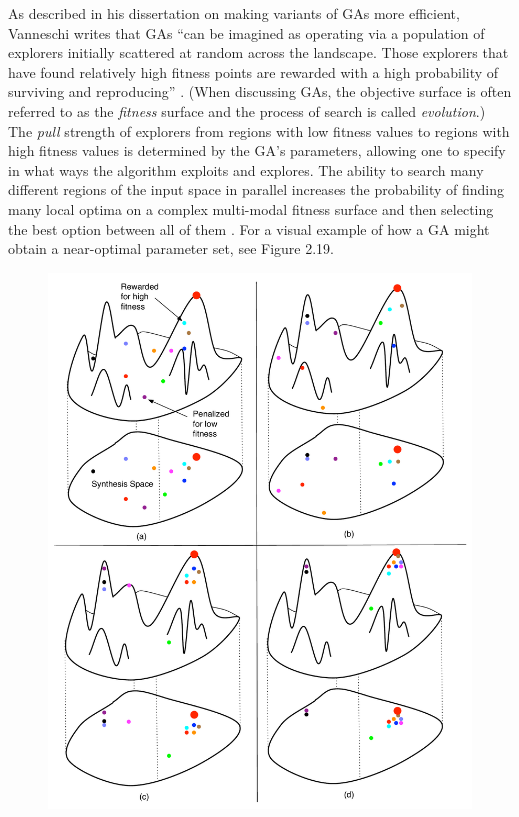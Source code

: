 \documentclass[a4paper,12pt]{report} 	%
\numberwithin{figure}{chapter}
\numberwithin{table}{chapter}
\numberwithin{equation}{chapter}
\begin{document}
\begin{flushleft}
As described in his dissertation on making variants of GAs more efficient, Vanneschi writes that GAs ``can be imagined as operating via a population of explorers initially scattered at random across the landscape. Those explorers that have found relatively high fitness points are rewarded with a high probability of surviving and reproducing'' \cite[p. 70]{Vanneschi:2004le}. (When discussing GAs, the objective surface is often referred to as the \emph{fitness} surface and the process of search is called \emph{evolution}.) The \emph{pull} strength of explorers from regions with low fitness values to regions with high fitness values is determined by the GA's parameters, allowing one to specify in what ways the algorithm exploits and explores. The ability to search many different regions of the input space in parallel increases the probability of finding many local optima on a complex multi-modal fitness surface and then selecting the best option between all of them \cite[p. 37]{Garcia:2001jw}. For a visual example of how a GA might obtain a near-optimal parameter set, see Figure 2.19.
\\
\begin{figure}[h!]
\begin{center}
\includegraphics[scale=0.50]{GASearch}

\end{center}
\end{figure}
\end{flushleft}
\end{document}
